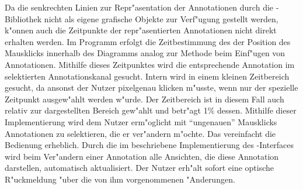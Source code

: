 Da die senkrechten Linien zur Repr"asentation der Annotationen durch die \jfcNS-Bibliothek nicht als eigene grafische Objekte zur Verf"ugung gestellt werden, k"onnen auch die Zeitpunkte der repr"asentierten Annotationen nicht direkt erhalten werden.
Im Programm erfolgt die Zeitbestimmung des der Position des Mausklicks innerhalb des Diagramms analog zur Methode beim Einf"ugen von Annotationen.
Mithilfe dieses Zeitpunktes wird die entsprechende Annotation im selektierten Annotationskanal gesucht.
Intern wird in einem kleinen Zeitbereich gesucht, da ansonst der Nutzer pixelgenau klicken m"usste, wenn nur der spezielle Zeitpunkt ausgew"ahlt werden w"urde.
Der Zeitbereich ist in diesem Fall auch relativ zur dargestellten Bereich gew"ahlt und betr"agt \unit{1}{\%} dessen.
Mithilfe dieser Implementierung wird dem Nutzer erm"oglicht mit "`ungenauen"' Mausklicks Annotationen zu selektieren, die er ver"andern m"ochte.
Das vereinfacht die Bedienung erheblich.
Durch die im  beschriebene Implementierung des -Interfaces wird beim Ver"andern einer Annotation alle Ansichten, die diese Annotation darstellen, automatisch aktualisiert.
Der Nutzer erh"alt sofort eine optische R"uckmeldung "uber die von ihm vorgenommenen "Anderungen.


